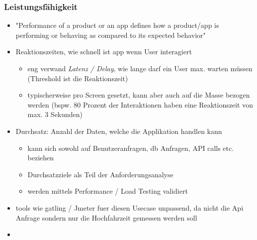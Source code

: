 \subsubsection{Leistungsfähigkeit}
\begin{itemize}
  \item "Performance of a product or an app defines how a product/app is performing or behaving as compared to its expected behavior"
  \item Reaktionszeiten, wie schnell ist app wenn User interagiert
  \begin{itemize}
    \item eng verwand \emph{Latenz / Delay}, wie lange darf ein User max. warten müssen (Threshold ist die Reaktionszeit)
    \item typischerweise pro Screen gesetzt, kann aber auch auf die Masse bezogen werden (bspw. 80 Prozent der Interaktionen haben eine Reaktionszeit von max. 3 Sekunden)
  \end{itemize}
  \item Durchsatz: Anzahl der Daten, welche die Applikation handlen kann
  \begin{itemize}
    \item kann sich sowohl auf Benutzeranfragen, db Anfragen, API calls etc. beziehen
    \item Durchsatzziele als Teil der Anforderungsanalyse
    \item werden mittels Performance / Load Testing validiert
  \end{itemize}
  \item tools wie gatling / Jmeter fuer diesen Usecase unpassend, da nicht die Api Anfrage sondern nur die Hochfahrzeit gemessen werden soll
  \item 
\end{itemize}

